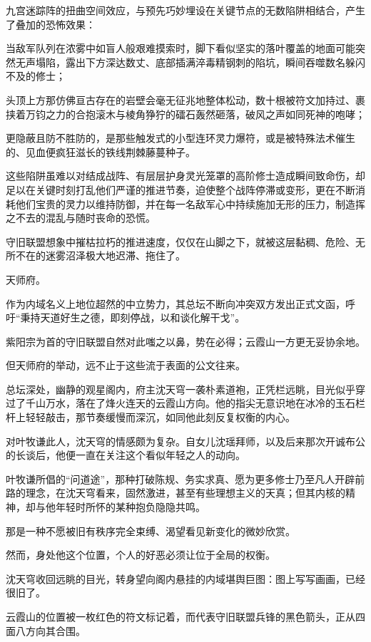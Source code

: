 九宫迷踪阵的扭曲空间效应，与预先巧妙埋设在关键节点的无数陷阱相结合，产生了叠加的恐怖效果：

当敌军队列在浓雾中如盲人般艰难摸索时，脚下看似坚实的落叶覆盖的地面可能突然无声塌陷，露出下方深达数丈、底部插满淬毒精钢刺的陷坑，瞬间吞噬数名躲闪不及的修士；

头顶上方那仿佛亘古存在的岩壁会毫无征兆地整体松动，数十根被符文加持过、裹挟着万钧之力的合抱滚木与棱角狰狞的礌石轰然砸落，破风之声如同死神的咆哮；

更隐蔽且防不胜防的，是那些触发式的小型连环灵力爆符，或是被特殊法术催生的、见血便疯狂滋长的铁线荆棘藤蔓种子。

这些陷阱虽难以对结成战阵、有层层护身灵光笼罩的高阶修士造成瞬间致命伤，却足以在关键时刻打乱他们严谨的推进节奏，迫使整个战阵停滞或变形，更在不断消耗他们宝贵的灵力以维持防御，并在每一名敌军心中持续施加无形的压力，制造挥之不去的混乱与随时丧命的恐慌。

守旧联盟想象中摧枯拉朽的推进速度，仅仅在山脚之下，就被这层黏稠、危险、无所不在的迷雾沼泽极大地迟滞、拖住了。

\vspace{2em}

天师府。

作为内域名义上地位超然的中立势力，其总坛不断向冲突双方发出正式文函，呼吁“秉持天道好生之德，即刻停战，以和谈化解干戈”。

紫阳宗为首的守旧联盟自然对此嗤之以鼻，势在必得；云霞山一方更无妥协余地。

但天师府的举动，远不止于这些流于表面的公文往来。

总坛深处，幽静的观星阁内，府主沈天穹一袭朴素道袍，正凭栏远眺，目光似乎穿过了千山万水，落在了烽火连天的云霞山方向。他的指尖无意识地在冰冷的玉石栏杆上轻轻敲击，那节奏缓慢而深沉，如同他此刻反复权衡的内心。

对叶牧谦此人，沈天穹的情感颇为复杂。自女儿沈瑶拜师，以及后来那次开诚布公的长谈后，他便一直在关注这个看似年轻之人的动向。

叶牧谦所倡的“问道途”，那种打破陈规、务实求真、愿为更多修士乃至凡人开辟前路的理念，在沈天穹看来，固然激进，甚至有些理想主义的天真；但其内核的精神，却与他年轻时所怀的某种抱负隐隐共鸣。

那是一种不愿被旧有秩序完全束缚、渴望看见新变化的微妙欣赏。

然而，身处他这个位置，个人的好恶必须让位于全局的权衡。

沈天穹收回远眺的目光，转身望向阁内悬挂的内域堪舆巨图：图上写写画画，已经很旧了。

云霞山的位置被一枚红色的符文标记着，而代表守旧联盟兵锋的黑色箭头，正从四面八方向其合围。

